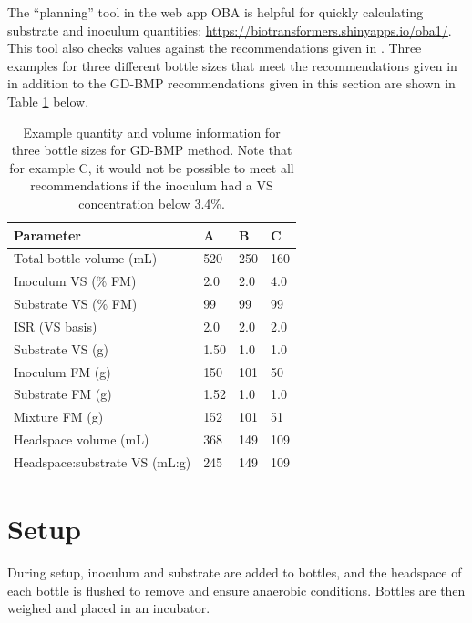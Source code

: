\documentclass[]{article}
\begin{document}
The ``planning'' tool in the web app OBA is helpful for quickly calculating substrate and inoculum quantities: \url{https://biotransformers.shinyapps.io/oba1/}.
This tool also checks values against the recommendations given in \citet{holligerStandardizationBiomethanePotential2016}.
Three examples for three different bottle sizes that meet the recommendations given in \citet{holligerStandardizationBiomethanePotential2016} in addition to the GD-BMP recommendations given in this section are shown in Table \ref{tab:examples} below.

\begin{table}[h] 
\caption{Example quantity and volume information for three bottle sizes for GD-BMP method. Note that for example C, it would not be possible to meet all recommendations if the inoculum had a VS concentration below 3.4\%.}
\label{tab:examples}
\begin{tabular}{llll}
\hline
Parameter                     & A    & B   & C   \\
\hline
Total bottle volume (mL)      & 520  & 250 & 160 \\
Inoculum VS (\% FM)           & 2.0  & 2.0 & 4.0 \\
Substrate VS (\% FM)          & 99   & 99  & 99  \\
ISR (VS basis)                & 2.0  & 2.0 & 2.0 \\
Substrate VS (g)              & 1.50 & 1.0 & 1.0 \\
Inoculum FM (g)               & 150  & 101 & 50  \\
Substrate FM (g)              & 1.52 & 1.0 & 1.0 \\
Mixture FM (g)                & 152  & 101 & 51  \\
Headspace volume (mL)         & 368  & 149 & 109 \\
Headspace:substrate VS (mL:g) & 245  & 149 & 109 \\
\hline
\end{tabular}
\end{table}


\section{Setup}
During setup, inoculum and substrate are added to bottles, and the headspace of each bottle is flushed to remove  and ensure anaerobic conditions. Bottles are then weighed and placed in an incubator.
\end{document}
